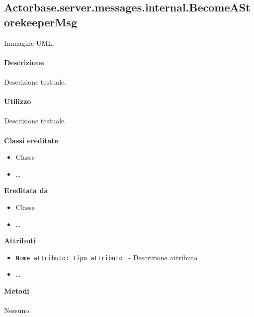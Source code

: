 \documentclass[a4paper]{article}
\begin{document}
	\subsection{Actorbase.server.messages.internal.BecomeAStorekeeperMsg}
		Immagine UML.
		\\ \\
		\textbf{Descrizione}
			\\ \\
			Descrizione testuale.
			\\ \\
		\textbf{Utilizzo}
			\\ \\
			Descrizione testuale.
			\\ \\
		\textbf{Classi ereditate}
			\begin{itemize}
				\item Classe
				\item \dots
			\end{itemize}
		\textbf{Ereditata da}
			\begin{itemize}
				\item Classe
				\item \dots
			\end{itemize}
		\textbf{Attributi}
			\begin{itemize}
				\item \texttt{Nome attributo: tipo attributo } - Descrizione attributo
				\item \dots
			\end{itemize}
		\textbf{Metodi}
			\\ \\
			Nessuno.
			
\end{document}
